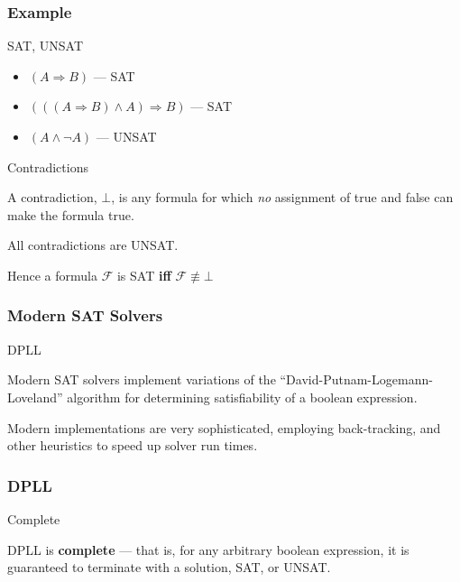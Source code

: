 \documentclass{beamer}
\begin{document}
\begin{frame}
\frametitle{Example}
\begin{exampleblock}
{SAT, UNSAT} 

\begin{itemize}
\item \((A \Rightarrow B)\) --- SAT
\item \((((A \Rightarrow B) \land A) \Rightarrow B)\) --- SAT
\item \((A \land \neg A)\) --- UNSAT
\end{itemize}
\end{exampleblock}

\begin{alertblock}
{Contradictions}

A contradiction, \(\bot\), is any formula for which \emph{no} assignment of true and false can make the formula true.

All contradictions are UNSAT.  

Hence a formula \(\mathcal{F}\) is SAT \textbf{iff} \(\mathcal{F} \not \equiv \bot\) 
\end{alertblock}

\end{frame}

\begin{frame}
\frametitle{Modern SAT Solvers}
\begin{block}
{DPLL} 

Modern SAT solvers implement variations of the ``David-Putnam-Logemann-Loveland'' algorithm for determining satisfiability of a boolean expression.

Modern implementations are very sophisticated, employing back-tracking, and other heuristics to speed up solver run times.

\end{block}
\end{frame}

\begin{frame}
\frametitle{DPLL}
\begin{alertblock}
{Complete} 

DPLL is \textbf{complete} --- that is, for any arbitrary boolean expression, it is guaranteed to terminate with a solution, SAT, or UNSAT.

\end{alertblock}
\end{frame}
\end{document}
